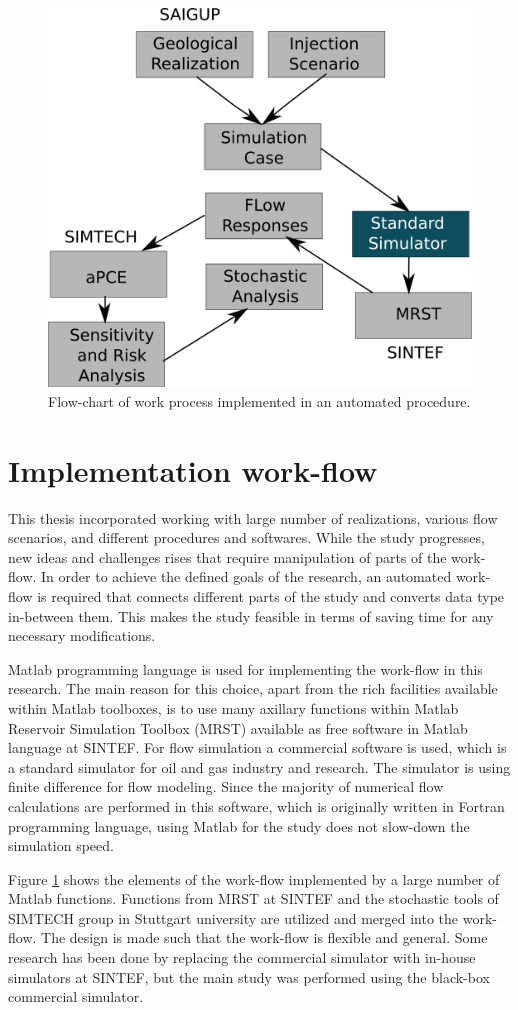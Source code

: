 \begin{figure}[thb]
  \centering
  \includegraphics[width=0.65 \linewidth]{./figurer/ENCL} 
  \caption{Flow-chart of work process implemented in an automated procedure.}
  \label{fig:encl}
%
\end{figure}

\section{Implementation work-flow}

This thesis incorporated working with large number of realizations, various flow scenarios, and different procedures and softwares. While the study progresses, new ideas and challenges rises that require manipulation of parts of the work-flow. In order to achieve the defined goals of the research, an automated work-flow is required that connects different parts of the study and converts data type in-between them. This makes the study feasible in terms of saving time for any necessary modifications.

Matlab programming language is used for implementing the work-flow in this research. The main reason for this choice, apart from the rich facilities available within Matlab toolboxes, is to use many axillary functions within Matlab Reservoir Simulation Toolbox (MRST) available as free software in Matlab language at SINTEF. For flow simulation a commercial software is used, which is a standard simulator for oil and gas industry and research. The simulator is using finite difference for flow modeling. Since the majority of numerical flow calculations are performed in this software, which is originally written in Fortran programming language, using Matlab for the study does not slow-down the simulation speed. 

Figure \ref{fig:encl} shows the elements of the work-flow implemented by a large number of Matlab functions. Functions from MRST at SINTEF and the stochastic tools of SIMTECH group in Stuttgart university are utilized and merged into the work-flow. The design is made such that the work-flow is flexible and general. Some research has been done by replacing the commercial simulator with in-house simulators at SINTEF, but the main study was performed using the black-box commercial simulator. 

